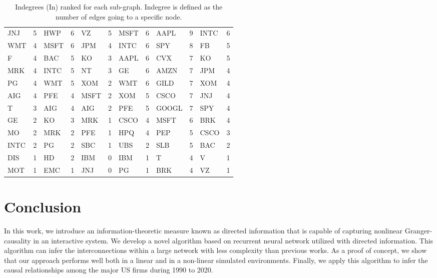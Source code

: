 \begin{table}[]
{\begin{tabular}{|ll|ll|ll|ll|ll|ll|}
JNJ  & 5  & HWP  & 6  & VZ   & 5  & MSFT & 6  & AAPL  & 9  & INTC  & 6  \\
WMT  & 4  & MSFT & 6  & JPM  & 4  & INTC & 6  & SPY   & 8  & FB    & 5  \\
F    & 4  & BAC  & 5  & KO   & 3  & AAPL & 6  & CVX   & 7  & KO    & 5  \\
MRK  & 4  & INTC & 5  & NT   & 3  & GE   & 6  & AMZN  & 7  & JPM   & 4  \\
PG   & 4  & WMT  & 5  & XOM  & 2  & WMT  & 6  & GILD  & 7  & XOM   & 4  \\
AIG  & 4  & PFE  & 4  & MSFT & 2  & XOM  & 5  & CSCO  & 7  & JNJ   & 4  \\
T    & 3  & AIG  & 4  & AIG  & 2  & PFE  & 5  & GOOGL & 7  & SPY   & 4  \\
GE   & 2  & KO   & 3  & MRK  & 1  & CSCO & 4  & MSFT  & 6  & BRK   & 4  \\
MO   & 2  & MRK  & 2  & PFE  & 1  & HPQ  & 4  & PEP   & 5  & CSCO  & 3  \\
INTC & 2  & PG   & 2  & SBC  & 1  & UBS  & 2  & SLB   & 5  & BAC   & 2  \\
DIS  & 1  & HD   & 2  & IBM  & 0  & IBM  & 1  & T     & 4  & V     & 1  \\
MOT  & 1  & EMC  & 1  & JNJ  & 0  & PG   & 1  & BRK   & 4  & VZ    & 1  \\ \hline
\end{tabular}}
\caption{Indegrees (In) ranked for each sub-graph. Indegree is defined as the number of edges going to a specific node.}
\label{indegree}
\end{table}

\section{Conclusion}\label{sec:con}

In this work, we introduce an information-theoretic measure known as directed information that is capable of capturing nonlinear Granger-causality in an interactive system. 
We develop a novel algorithm based on recurrent neural network utilized with directed information. 
This algorithm can infer the interconnections within a large network with less complexity than previous works. As a proof of concept, we show that our approach performs well both in a linear and in a non-linear simulated environments. Finally, we apply this algorithm to infer the causal relationships among the major US firms during 1990 to 2020. 

 
 




